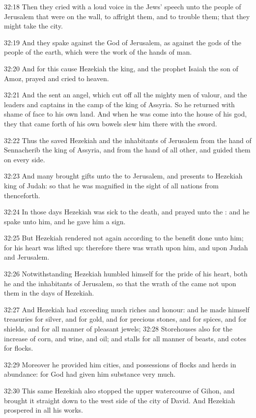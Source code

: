 32:18 Then they cried with a loud voice in the Jews' speech unto the
people of Jerusalem that were on the wall, to affright them, and to
trouble them; that they might take the city.

32:19 And they spake against the God of Jerusalem, as against the gods
of the people of the earth, which were the work of the hands of man.

32:20 And for this cause Hezekiah the king, and the prophet Isaiah the
son of Amoz, prayed and cried to heaven.

32:21 And the \LORD sent an angel, which cut off all the mighty men of
valour, and the leaders and captains in the camp of the king of
Assyria. So he returned with shame of face to his own land. And when
he was come into the house of his god, they that came forth of his own
bowels slew him there with the sword.

32:22 Thus the \LORD saved Hezekiah and the inhabitants of Jerusalem
from the hand of Sennacherib the king of Assyria, and from the hand of
all other, and guided them on every side.

32:23 And many brought gifts unto the \LORD to Jerusalem, and presents
to Hezekiah king of Judah: so that he was magnified in the sight of
all nations from thenceforth.

32:24 In those days Hezekiah was sick to the death, and prayed unto
the \LORD: and he spake unto him, and he gave him a sign.

32:25 But Hezekiah rendered not again according to the benefit done
unto him; for his heart was lifted up: therefore there was wrath upon
him, and upon Judah and Jerusalem.

32:26 Notwithstanding Hezekiah humbled himself for the pride of his
heart, both he and the inhabitants of Jerusalem, so that the wrath of
the \LORD came not upon them in the days of Hezekiah.

32:27 And Hezekiah had exceeding much riches and honour: and he made
himself treasuries for silver, and for gold, and for precious stones,
and for spices, and for shields, and for all manner of pleasant
jewels; 32:28 Storehouses also for the increase of corn, and wine, and
oil; and stalls for all manner of beasts, and cotes for flocks.

32:29 Moreover he provided him cities, and possessions of flocks and
herds in abundance: for God had given him substance very much.

32:30 This same Hezekiah also stopped the upper watercourse of Gihon,
and brought it straight down to the west side of the city of David.
And Hezekiah prospered in all his works.

